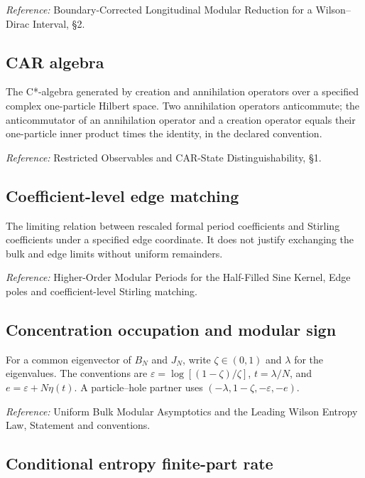 \documentclass[
  10pt,
  a4paper,
]{article}
\begin{document}
\nopagebreak[4]

\emph{Reference:} Boundary-Corrected Longitudinal Modular Reduction for a Wilson--Dirac Interval, §2.

\subsection{CAR algebra}\label{car-algebra}

The C*-algebra generated by creation and annihilation operators over a specified complex one-particle Hilbert space. Two annihilation operators anticommute; the anticommutator of an annihilation operator and a creation operator equals their one-particle inner product times the identity, in the declared convention.

\nopagebreak[4]

\emph{Reference:} Restricted Observables and CAR-State Distinguishability, §1.

\subsection{Coefficient-level edge matching}\label{coefficient-level-edge-matching}

The limiting relation between rescaled formal period coefficients and Stirling coefficients under a specified edge coordinate. It does not justify exchanging the bulk and edge limits without uniform remainders.

\nopagebreak[4]

\emph{Reference:} Higher-Order Modular Periods for the Half-Filled Sine Kernel, Edge poles and coefficient-level Stirling matching.

\subsection{Concentration occupation and modular sign}\label{concentration-occupation-and-modular-sign}

For a common eigenvector of \(B_N\) and \(J_N\), write \(\zeta\in(0,1)\) and \(\lambda\) for the eigenvalues. The conventions are \(\varepsilon=\log[(1-\zeta)/\zeta]\), \(t=\lambda/N\), and \(e=\varepsilon+N\eta(t)\). A particle--hole partner uses \((-\lambda,1-\zeta,-\varepsilon,-e)\).

\nopagebreak[4]

\emph{Reference:} Uniform Bulk Modular Asymptotics and the Leading Wilson Entropy Law, Statement and conventions.

\subsection{Conditional entropy finite-part rate}\label{conditional-entropy-finite-part-rate}
\end{document}
